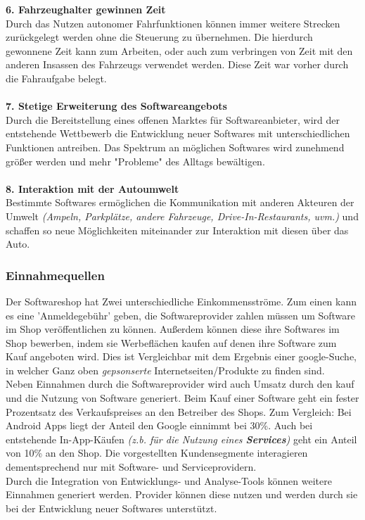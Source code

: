 \textbf{6. Fahrzeughalter gewinnen Zeit}\\
Durch das Nutzen autonomer Fahrfunktionen können immer weitere Strecken zurückgelegt werden ohne die Steuerung zu übernehmen. Die hierdurch gewonnene Zeit kann zum Arbeiten, oder auch zum verbringen von Zeit mit den anderen Insassen des Fahrzeugs verwendet werden. Diese Zeit war vorher durch die Fahraufgabe belegt.\\\\
\textbf{7. Stetige Erweiterung des Softwareangebots}\\
Durch die Bereitstellung eines offenen Marktes für Softwareanbieter, wird der entstehende Wettbewerb die Entwicklung neuer Softwares mit unterschiedlichen Funktionen antreiben. Das Spektrum an möglichen Softwares wird zunehmend größer werden und mehr "Probleme" des Alltags bewältigen.\\\\
\textbf{8. Interaktion mit der Autoumwelt}\\
Bestimmte Softwares ermöglichen die Kommunikation mit anderen Akteuren der Umwelt \textit{(Ampeln, Parkplätze, andere Fahrzeuge, Drive-In-Restaurants, uvm.)} und schaffen so neue Möglichkeiten miteinander zur Interaktion mit diesen über das Auto.

\subsubsection{Einnahmequellen}
Der Softwareshop hat Zwei unterschiedliche Einkommensströme. Zum einen kann es eine 'Anmeldegebühr' geben, die Softwareprovider zahlen müssen um Software im Shop veröffentlichen zu können. Außerdem können diese ihre Softwares im Shop bewerben, indem sie Werbeflächen kaufen auf denen ihre Software zum Kauf angeboten wird. Dies ist Vergleichbar mit dem Ergebnis einer google-Suche, in welcher Ganz oben \textit{gepsonserte} Internetseiten/Produkte zu finden sind.\\
Neben Einnahmen durch die Softwareprovider wird auch Umsatz durch den kauf und die Nutzung von Software generiert. Beim Kauf einer Software geht ein fester Prozentsatz des Verkaufspreises an den Betreiber des Shops. Zum Vergleich: Bei Android Apps liegt der Anteil den Google einnimmt bei 30\%. Auch bei entstehende In-App-Käufen \textit{(z.b. für die Nutzung eines \textbf{Services})} geht ein Anteil von 10\% an den Shop. Die vorgestellten Kundensegmente interagieren dementsprechend nur mit Software- und Serviceprovidern.\\
Durch die Integration von Entwicklungs- und Analyse-Tools können weitere Einnahmen generiert werden. Provider können diese nutzen und werden durch sie bei der Entwicklung neuer Softwares unterstützt.

